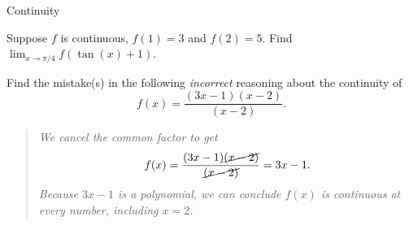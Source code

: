 \documentclass[../main.tex]{subfiles}
\begin{document}
\begin{lesson}{Continuity}
  \begin{example}
    Suppose \(f\) is continuous, \(f(1) = 3\) and \(f(2) = 5\).  Find \(\lim_{x \to \pi/4} f( \tan(x) + 1 )\).

  \end{example}

  \begin{example}
    Find the mistake(s) in the following \emph{incorrect} reasoning about the continuity of \[f(x) = \frac{(3x-1)(x-2)}{(x-2)}.\]
    \bigskip

    \begin{quote}
      \itshape
      We cancel the common factor to get
      \[
        f(x) = \frac{(3x - 1)\cancel{(x - 2)}}{\cancel{(x-2)}} = 3x - 1.
      \]
      Because \(3x - 1\) is a polynomial, we can conclude \(f(x)\) is continuous at every number, including \(x=2\).
    \end{quote}

  \end{example}
\end{lesson}
\end{document}
